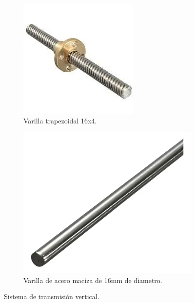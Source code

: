 \begin{figure}[H]
    \centering
    \begin{subfigure}{0.3\textwidth}
        \centering
        \includegraphics[width=\textwidth]{img/v_roscada.png}
        \caption{Varilla trapezoidal 16x4.}
        \label{fig:v_roscada}
    \end{subfigure}
    \hfill
    \begin{subfigure}{0.3\textwidth}
        \centering
        \includegraphics[width=\textwidth]{img/varilla lisa.png}
        \caption{Varilla de acero maciza de 16mm de diametro.}
        \label{fig:varilla lisa}
    \end{subfigure}
    \caption{Sistema de transmisión vertical.}
\end{figure}


